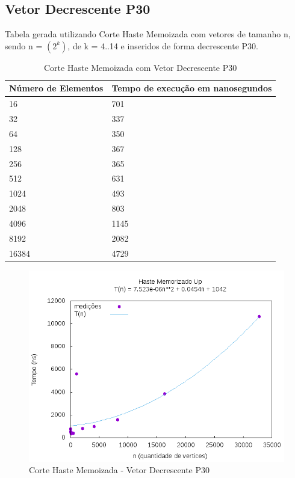 \documentclass[12pt,a4paper,twoside]{report}
\begin{document}
\subsection{Vetor Decrescente P30}
Tabela gerada utilizando Corte Haste Memoizada com vetores de tamanho n, sendo n = $(2^k)$, de k = 4..14 e inseridos de forma decrescente P30.
\begin{table}[H]
\centering
\caption{Corte Haste Memoizada com Vetor Decrescente P30}
\label{my-label}
\begin{tabular}{|l|l|}
\hline
\multicolumn{1}{|c|}{\textbf{Número de Elementos}} & \multicolumn{1}{c|}{\textbf{Tempo de execução em nanosegundos}} \\ \hline
16 & 701 \\ \hline
32 & 337 \\ \hline
64 & 350 \\ \hline
128 & 367 \\ \hline
256 & 365 \\ \hline
512 & 631 \\ \hline
1024 & 493 \\ \hline
2048 & 803 \\ \hline
4096 & 1145 \\ \hline
8192 & 2082 \\ \hline
16384 & 4729 \\ \hline

\end{tabular}
\end{table}

\begin{figure}[H]
    \centering
    \includegraphics[width=0.7\linewidth]{graficos/CorteHasteMemorizado/Decrescente P30/HasteMemo.png}
  \caption{Corte Haste Memoizada - Vetor Decrescente P30}
\end{figure}
\end{document}
